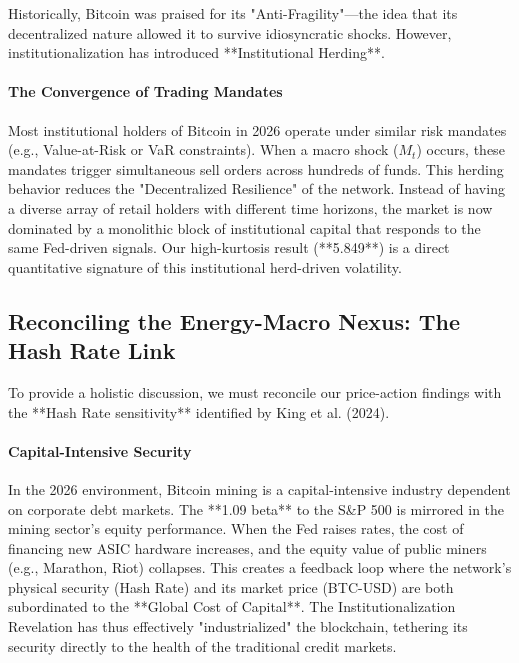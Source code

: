 \documentclass[10pt, conference, compsocconf]{IEEEtran}
\begin{document}
Historically, Bitcoin was praised for its "Anti-Fragility"—the idea that its decentralized nature allowed it to survive idiosyncratic shocks. However, institutionalization has introduced **Institutional Herding**.

\paragraph{The Convergence of Trading Mandates}
Most institutional holders of Bitcoin in 2026 operate under similar risk mandates (e.g., Value-at-Risk or VaR constraints). When a macro shock ($M_t$) occurs, these mandates trigger simultaneous sell orders across hundreds of funds. This herding behavior reduces the "Decentralized Resilience" of the network. Instead of having a diverse array of retail holders with different time horizons, the market is now dominated by a monolithic block of institutional capital that responds to the same Fed-driven signals. Our high-kurtosis result (**5.849**) is a direct quantitative signature of this institutional herd-driven volatility.


\subsection{Reconciling the Energy-Macro Nexus: The Hash Rate Link}

To provide a holistic discussion, we must reconcile our price-action findings with the **Hash Rate sensitivity** identified by King et al. (2024).

\paragraph{Capital-Intensive Security}
In the 2026 environment, Bitcoin mining is a capital-intensive industry dependent on corporate debt markets. The **1.09 beta** to the S\&P 500 is mirrored in the mining sector's equity performance. When the Fed raises rates, the cost of financing new ASIC hardware increases, and the equity value of public miners (e.g., Marathon, Riot) collapses. This creates a feedback loop where the network's physical security (Hash Rate) and its market price (BTC-USD) are both subordinated to the **Global Cost of Capital**. The Institutionalization Revelation has thus effectively "industrialized" the blockchain, tethering its security directly to the health of the traditional credit markets.
\end{document}
